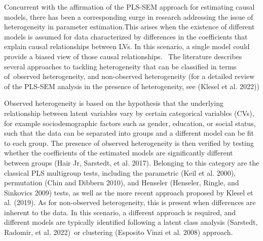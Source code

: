 Concurrent with the affirmation of the PLS-SEM approach for estimating
causal models, there has been a corresponding surge in research
addressing the issue of heterogeneity in parameter estimation.This
arises when the existence of different models is assumed for data
characterized by differences in the coefficients that explain causal
relationships between LVs. In this scenario, a single model could
provide a biased view of those causal relationships. ~The literature
describes several approaches to tackling heterogeneity that can be
classified in terms of~observed heterogeneity, and non-observed
heterogeneity (for a detailed review of the PLS-SEM analysis in the
presence of heterogeneity, see (Klesel et al. 2022))

Observed heterogeneity is based on the hypothesis that the underlying
relationship between latent variables vary by certain categorical
variables (CVs), for example sociodemographic factors such as gender,
education, or social status, such that the data can be separated into
groups and a different model can be fit to each group. The presence of
observed heterogeneity is then verified by testing whether the
coefficients of the estimated models are significantly different between
groups (Hair Jr, Sarstedt, et al. 2017). Belonging to this category are the classical PLS
multigroup tests, including the parametric (Keil et al. 2000), permutation
(Chin and Dibbern 2010), and Henseler (Henseler, Ringle, and Sinkovics 2009) tests, as well as the more recent
approach proposed by Klesel et al. (2019). As for non-observed heterogeneity, this
is present when differences are inherent to the data. In this scenario,
a different approach is required, and different models are typically
identified following a latent class analysis (Sarstedt, Radomir, et al. 2022)~or
clustering (Esposito Vinzi et al. 2008) approach.

